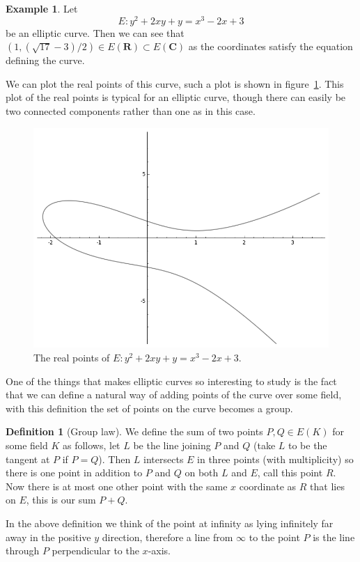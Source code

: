 \documentclass[12pt,a4paper,abstracton,bibtotoc]{scrreprt}
\theoremstyle{definition}
\newtheorem{defn}{Definition}
\newtheorem{ex}{Example}
\newcommand{\RR}{\mathbf{R}}
\newcommand{\CC}{\mathbf{C}}
\begin{document}
\begin{ex}
Let 
\[
E \colon y^2 + 2xy + y = x^3 - 2x + 3
\]
be an elliptic curve.
Then we can see that $(1,(\sqrt{17}-3)/2)\in E(\RR) \subset E(\CC)$ as the coordinates satisfy the equation defining the curve.

We can plot the real points of this curve, such a plot is shown in figure~\ref{fig:ec}.
This plot of the real points is typical for an elliptic curve, though there can easily be two connected components rather than one as in this case.
\begin{figure}
\centering
\includegraphics[scale=0.6]{sageec}
\caption{\label{fig:ec}The real points of $E \colon y^2 + 2xy + y = x^3 - 2x + 3$.}
\end{figure}
\end{ex}

One of the things that makes elliptic curves so interesting to study is the fact that we can define a natural way of adding points of the curve over some field, with this definition the set of points on the curve becomes a group.

\begin{defn}[Group law]
We define the sum of two points $P,Q\in E(K)$ for some field $K$ as follows, let $L$ be the line joining $P$ and $Q$ (take $L$ to be the tangent at $P$ if $P=Q$).
Then $L$ intersects $E$ in three points (with multiplicity) so there is one point in addition to $P$ and $Q$ on both $L$ and $E$, call this point $R$.
Now there is at most one other point with the same $x$ coordinate as $R$ that lies on $E$, this is our sum $P+Q$.

In the above definition we think of the point at infinity as lying infinitely far away in the positive $y$ direction, therefore a line from $\infty$ to the point $P$ is the line through $P$ perpendicular to the $x$-axis.
\end{defn}
\end{document}
